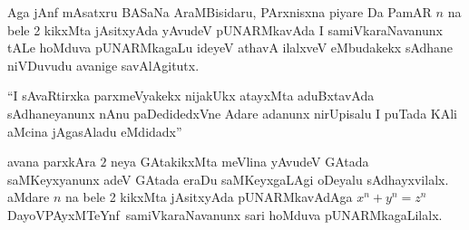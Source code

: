 Aga jAnf mAsatxru BASaNa AraMBisidaru, PArxnisxna piyare Da PamAR $n$ na bele {\rm 2} kikxMta jAsitxyAda yAvudeV pUNARMkavAda I samiVkaraNavanunx tALe hoMduva pUNARMkagaLu ideyeV athavA ilalxveV eMbudakekx sAdhane niVDuvudu avanige savAlAgitutx.

``I sAvaRtirxka parxmeVyakekx nijakUkx atayxMta aduBxtavAda sAdhaneyanunx nAnu paDedidedxVne Adare adanunx nirUpisalu I puTada KAli aMcina jAgasAladu eMdidadx''

avana parxkAra $2$ neya GAtakikxMta meVlina yAvudeV GAtada saMKeyxyanunx adeV GAtada eraDu saMKeyxgaLAgi oDeyalu sAdhayxvilalx. aMdare $n$ na bele {\rm 2} kikxMta jAsitx\-yAda pUNARMkavAdAga $x^n+y^n=z^n$ DayoVPAyxMTeYnf~samiVkaraNavanunx sari hoMduva pUNARMkagaLilalx.

